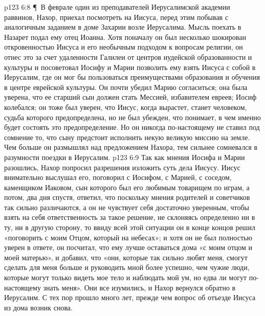 \vs p123 6:8 \P\ В феврале один из преподавателей Иерусалимской академии раввинов, Нахор, приехал посмотреть на Иисуса, перед этим побывав с аналогичным заданием в доме Захарии возле Иерусалима. Мысль поехать в Назарет подал ему отец Иоанна. Хотя поначалу он был несколько шокирован откровенностью Иисуса и его необычным подходом к вопросам религии, он отнес это за счет удаленности Галилеи от центров иудейской образованности и культуры и посоветовал Иосифу и Марии позволить ему взять Иисуса с собой в Иерусалим, где он мог бы пользоваться преимуществами образования и обучения в центре еврейской культуры. Он почти убедил Марию согласиться; она была уверена, что ее старший сын должен стать Мессией, избавителем евреев; Иосиф колебался; он тоже был уверен, что Иисус, когда вырастет, станет человеком, судьба которого предопределена, но не был убежден, что понимает, в чем именно будет состоять это предопределение. Но он никогда по\hyp{}настоящему не ставил под сомнение то, что сыну предстоит исполнить некую великую миссию на земле. Чем больше он размышлял над предложением Нахора, тем сильнее сомневался в разумности поездки в Иерусалим.
\vs p123 6:9 Так как мнения Иосифа и Марии разошлись, Нахор попросил разрешения изложить суть дела Иисусу. Иисус внимательно выслушал его, поговорил с Иосифом, с Марией, с соседом, каменщиком Иаковом, сын которого был его любимым товарищем по играм, а потом, два дня спустя, ответил, что поскольку мнения родителей и советчиков так сильно различаются, а он не чувствует себя достаточно уверенным, чтобы взять на себя ответственность за такое решение, не склоняясь определенно ни в ту, ни в другую сторону, то ввиду всей этой ситуации он в конце концов решил «поговорить с моим Отцом, который на небесах»; и хотя он не был полностью уверен в ответе, он посчитал, что ему лучше оставаться дома «с моим отцом и моей матерью», и добавил, что «они, которые так сильно любят меня, смогут сделать для меня больше и руководить мной более успешно, чем чужие люди, которые могут только видеть мое тело и наблюдать мой ум, но едва ли могут по\hyp{}настоящему знать меня». Они все изумились, и Нахор вернулся обратно в Иерусалим. С тех пор прошло много лет, прежде чем вопрос об отъезде Иисуса из дома возник снова.
